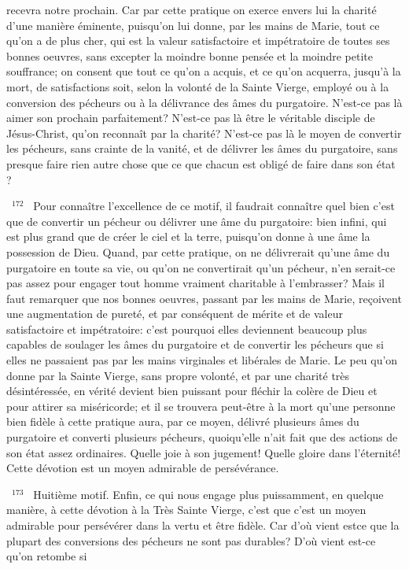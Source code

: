 \documentclass[paper=a5,pagesize=pdftex,fontsize=15pt,headinclude=on,twoside=off]{scrbook}
\newcommand{\negphantom}[1]{\settowidth{\dimen0}{#1}\hspace*{-\dimen0}}
\newcommand{\versenb}[1]{\par \vspace{10pt}~\negphantom{~${}^{#1}$~}${}^{#1}$~}
\begin{document}
recevra notre prochain. Car par cette pratique on exerce envers lui la charité d'une manière éminente, puisqu'on lui
donne, par les mains de Marie, tout ce qu'on a de plus cher, qui est la valeur satisfactoire et impétratoire de toutes
ses bonnes oeuvres, sans excepter la moindre bonne pensée et la moindre petite souffrance; on consent que tout
ce qu'on a acquis, et ce qu'on acquerra, jusqu'à la mort, de satisfactions soit, selon la volonté de la Sainte Vierge,
employé ou à la conversion des pécheurs ou à la délivrance des âmes du purgatoire.
N'est-ce pas là aimer son prochain parfaitement? N'est-ce pas là être le véritable disciple de Jésus-Christ, qu'on
reconnaît par la charité? N'est-ce pas là le moyen de convertir les pécheurs, sans crainte de la vanité, et de
délivrer les âmes du purgatoire, sans presque faire rien autre chose que ce que chacun est obligé de faire dans
son état ?
\versenb{172} Pour connaître l'excellence de ce motif, il faudrait connaître quel bien c'est que de convertir un pécheur ou
délivrer une âme du purgatoire: bien infini, qui est plus grand que de créer le ciel et la terre, puisqu'on donne à une
âme la possession de Dieu. Quand, par cette pratique, on ne délivrerait qu'une âme du purgatoire en toute sa vie,
ou qu'on ne convertirait qu'un pécheur, n'en serait-ce pas assez pour engager tout homme vraiment charitable à
l'embrasser? Mais il faut remarquer que nos bonnes oeuvres, passant par les mains de Marie, reçoivent une
augmentation de pureté, et par conséquent de mérite et de valeur satisfactoire et impétratoire: c'est pourquoi elles
deviennent beaucoup plus capables de soulager les âmes du purgatoire et de convertir les pécheurs que si elles
ne passaient pas par les mains virginales et libérales de Marie. Le peu qu'on donne par la Sainte Vierge, sans
propre volonté, et par une charité très désintéressée, en vérité devient bien puissant pour fléchir la colère de Dieu
et pour attirer sa miséricorde; et il se trouvera peut-être à la mort qu'une personne bien fidèle à cette pratique aura,
par ce moyen, délivré plusieurs âmes du purgatoire et converti plusieurs pécheurs, quoiqu'elle n'ait fait que des
actions de son état assez ordinaires. Quelle joie à son jugement! Quelle gloire dans l'éternité!
Cette dévotion est un moyen admirable de persévérance.
\versenb{173} Huitième motif. Enfin, ce qui nous engage plus puissamment, en quelque manière, à cette dévotion à la Très
Sainte Vierge, c'est que c'est un moyen admirable pour persévérer dans la vertu et être fidèle. Car d'où vient estce que la plupart des conversions des pécheurs ne sont pas durables? D'où vient est-ce qu'on retombe si
\end{document}
